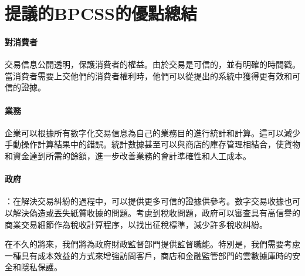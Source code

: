 	\section{提議的BPCSS的優點總結}

		\paragraph{對消費者}交易信息公開透明，保護消費者的權益。由於交易是可信的，並有明確的時間戳。當消費者需要上交他們的消費者權利時，他們可以從提出的系統中獲得更有效和可信的證據。
		\paragraph{業務}企業可以根據所有數字化交易信息為自己的業務目的進行統計和計算。這可以減少手動操作計算結果中的錯誤。統計數據甚至可以與商店的庫存管理相結合，使貨物和資金達到所需的餘額，進一步改善業務的會計準確性和人工成本。
		\paragraph{政府}：在解決交易糾紛的過程中，可以提供更多可信的證據供參考。數字交易收據也可以解決偽造或丟失紙質收據的問題。考慮到稅收問題，政府可以審查具有高信譽的商業交易細節作為稅收計算程序，以找出征稅標準，減少許多稅收糾紛。

在不久的將來，我們將為政府財政監督部門提供監督職能。特別是，我們需要考慮一種具有成本效益的方式來增強訪問客戶，商店和金融監管部門的雲數據庫時的安全和隱私保護。

